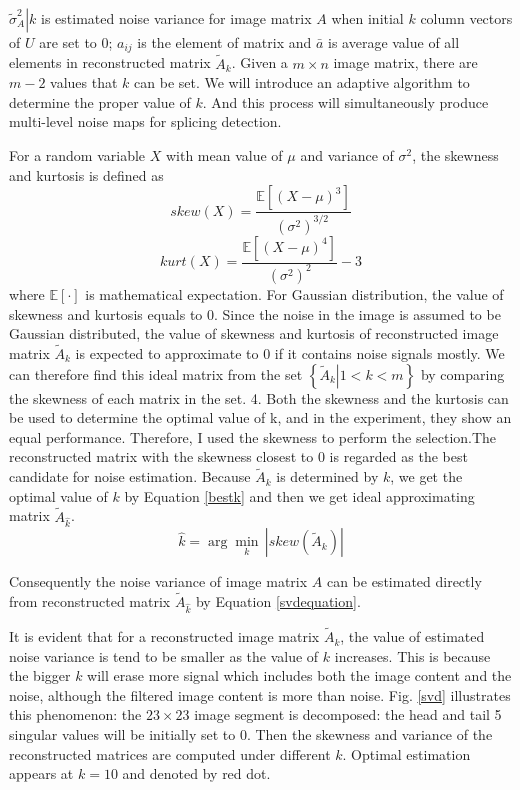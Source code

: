 \documentclass[a4paper, 12pt, twoside]{report}
\begin{document}
$\left. \tilde{\sigma }_{A}^{2} \right|k$ is estimated noise variance for image matrix $A$ when initial $k$ column vectors of $U$ are set to 0; ${{a}_{ij}}$ is the element of matrix and $\bar{a}$ is average value of all elements in reconstructed matrix ${{\tilde{A}}_{k}}$. Given a $m\times n$  image matrix, there are $m-2$ values that $k$ can be set. We will introduce an adaptive algorithm to determine the proper value of $k$. And this process will simultaneously produce multi-level noise maps for splicing detection.

For a random variable $X$ with mean value of $\mu $ and  variance of ${{\sigma }^{2}}$, the skewness and kurtosis is defined as
\begin{equation}
	skew(X)=\frac{\mathbb{E}[{{(X-\mu )}^{3}}]}{{{({{\sigma }^{2}})}^{3/2\;}}} 
\end{equation}
\begin{equation}
	kurt(X)=\frac{\mathbb{E}[{{(X-\mu )}^{4}}]}{{{({{\sigma }^{2}})}^{2}}}-3
\end{equation}
where $\mathbb{E}[\cdot ]$ is mathematical expectation. For Gaussian distribution, the value of skewness and kurtosis equals to 0. Since the noise in the image is assumed to be Gaussian distributed, the value of skewness and kurtosis of reconstructed image matrix ${{\tilde{A}}_{k}}$ is expected to approximate to 0 if it contains noise signals mostly. We can therefore find this ideal matrix from the set $\left\{ \left. {{{\tilde{A}}}_{k}} \right|1<k<m \right\}$ by comparing the skewness of each matrix in the set. 4. Both the skewness and the kurtosis can be used to determine the optimal value of k, and in the experiment, they show an equal performance. Therefore, I used the skewness to perform the selection.The reconstructed matrix with the skewness closest to 0 is regarded as the best candidate for noise estimation. Because ${{\tilde{A}}_{k}}$ is determined by $k$, we get the optimal value of $k$ by Equation \ref{bestk} and then we get ideal approximating matrix ${{\tilde{A}}_{{\hat{k}}}}$. 
\begin{equation}
	\hat{k}=\arg \underset{k}{\mathop{\min }}\,\left| skew({{{\tilde{A}}}_{k}}) \right|
	\label{bestk}
\end{equation}

Consequently the noise variance of image matrix $A$ can be estimated directly from reconstructed matrix ${{\tilde{A}}_{{\hat{k}}}}$ by Equation \ref{svdequation}. 

It is evident that for a reconstructed image matrix ${{\tilde{A}}_{k}}$, the value of estimated noise variance is tend to be smaller as the value of $k$ increases. This is because the bigger $k$ will erase more signal which includes both the image content and the noise, although the filtered image content is more than noise. Fig. \ref{svd} illustrates this phenomenon: the $23\times 23$ image segment is decomposed: the head and tail 5 singular values will be initially set to 0. Then the skewness and variance of the reconstructed matrices are computed under different $k$. Optimal estimation appears at $k=10$ and denoted by red dot. 
\end{document}
